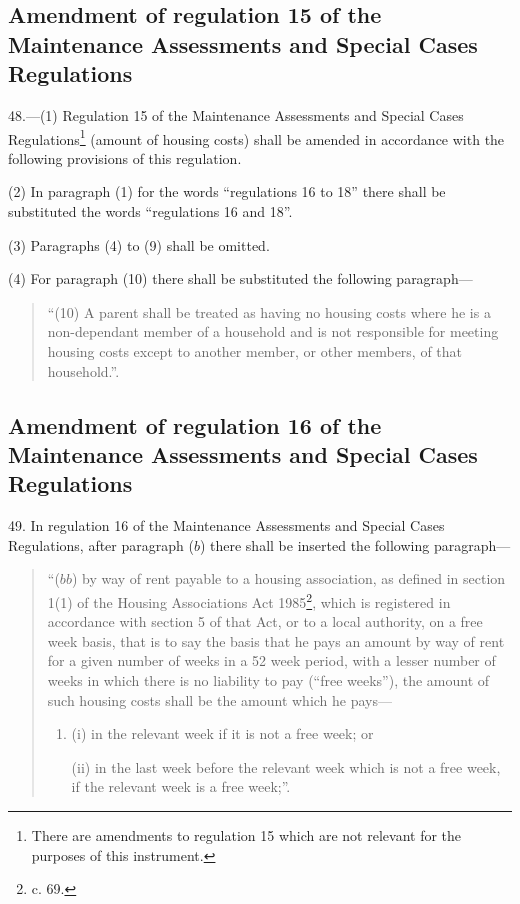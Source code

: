 \documentclass[12pt,a4paper]{article}
\begin{document}
\subsection[48. Amendment of regulation 15 of the Maintenance Assessments and Special Cases Regulations]{Amendment of regulation 15 of the Maintenance Assessments and Special Cases Regulations}

48.—(1) Regulation 15 of the Maintenance Assessments and Special Cases Regulations\footnote{\frenchspacing There are amendments to regulation 15 which are not relevant for the purposes of this instrument.} (amount of housing costs) shall be amended in accordance with the following provisions of this regulation.

(2) In paragraph (1) for the words “regulations 16 to 18” there shall be substituted the words “regulations 16 and 18”. 

(3) Paragraphs (4) to (9) shall be omitted.

(4) For paragraph (10) there shall be substituted the following paragraph—
\begin{quotation}
“(10) A parent shall be treated as having no housing costs where he is a non-dependant member of a household and is not responsible for meeting housing costs except to another member, or other members, of that household.”.
\end{quotation}

\subsection[49. Amendment of regulation 16 of the Maintenance Assessments and Special Cases Regulations]{Amendment of regulation 16 of the Maintenance Assessments and Special Cases Regulations}

49.  In regulation 16 of the Maintenance Assessments and Special Cases Regulations, after paragraph ($b$) there shall be inserted the following paragraph—
\begin{quotation}
“($bb$) by way of rent payable to a housing association, as defined in section 1(1) of the Housing Associations Act 1985\footnote{ c. 69.}, which is registered in accordance with section 5 of that Act, or to a local authority, on a free week basis, that is to say the basis that he pays an amount by way of rent for a given number of weeks in a 52 week period, with a lesser number of weeks in which there is no liability to pay (“free weeks”), the amount of such housing costs shall be the amount which he pays---
\begin{enumerate}\item[]
(i) in the relevant week if it is not a free week; or

(ii) in the last week before the relevant week which is not a free week, if the relevant week is a free week;”.
\end{enumerate}
\end{quotation}
\end{document}
